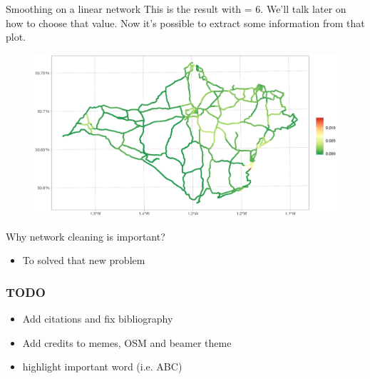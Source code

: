 \documentclass[c,10pt,pdftex]{beamer}
\begin{document}
\begin{frame}{Smoothing on a linear network}
\vspace{-0.25cm}
This is the result with = 6. We'll talk later on how to choose that value. Now it's possible to extract some information from that plot. 
\begin{figure}
	\centering
	\includegraphics[width=\linewidth]{images/car_crashes_per_meter_smooth6}
\end{figure}
\end{frame}

\begin{frame}{Why network cleaning is important?}
\begin{itemize}
	\setlength\itemsep{1em}
	\item To solved that new problem
\end{itemize}
\end{frame}

\begin{frame}
\frametitle{TODO}
\begin{itemize}
	\item Add citations and fix bibliography
	\item Add credits to memes, OSM and beamer theme
	\item highlight important word (i.e. \alert{ABC})
\end{itemize}
\end{frame}
\end{document}
